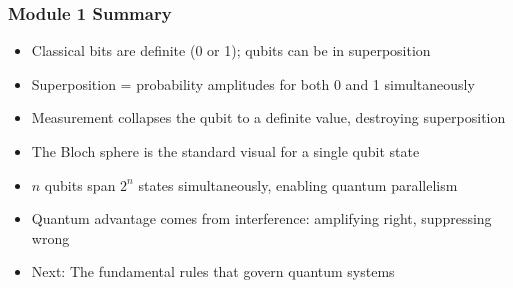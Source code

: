 \begin{frame}[fragile]\frametitle{Module 1 Summary}
\begin{itemize}
\item Classical bits are definite (0 or 1); qubits can be in superposition
\item Superposition = probability amplitudes for both 0 and 1 simultaneously
\item Measurement collapses the qubit to a definite value, destroying superposition
\item The Bloch sphere is the standard visual for a single qubit state
\item $n$ qubits span $2^n$ states simultaneously, enabling quantum parallelism
\item Quantum advantage comes from interference: amplifying right, suppressing wrong
\item Next: The fundamental rules that govern quantum systems
\end{itemize}
\end{frame}
